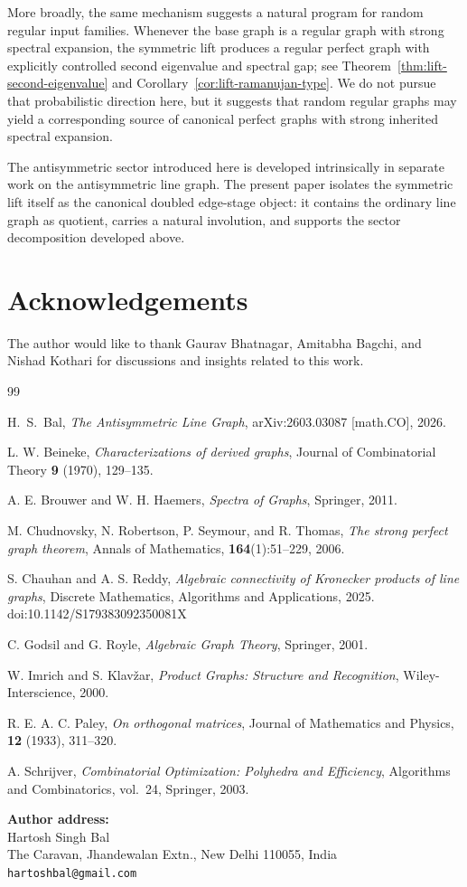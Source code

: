 \documentclass[11pt]{article}
\theoremstyle{plain}
\begin{document}
More broadly, the same mechanism suggests a natural program for random regular input families. Whenever the
base graph is a regular graph with strong spectral expansion, the symmetric lift produces a regular perfect
graph with explicitly controlled second eigenvalue and spectral gap; see
Theorem~\ref{thm:lift-second-eigenvalue} and Corollary~\ref{cor:lift-ramanujan-type}. We do not pursue that
probabilistic direction here, but it suggests that random regular graphs may yield a corresponding source of
canonical perfect graphs with strong inherited spectral expansion.

The antisymmetric sector introduced here is developed intrinsically in separate work on the antisymmetric
line graph. The present paper isolates the symmetric lift itself as the canonical doubled edge-stage object:
it contains the ordinary line graph as quotient, carries a natural involution, and supports the sector
decomposition developed above.

\section*{Acknowledgements}

The author would like to thank Gaurav Bhatnagar, Amitabha Bagchi, and Nishad Kothari for discussions and insights related to this work.


\begin{thebibliography}{99}

H.~S.~Bal,
\newblock \emph{The Antisymmetric Line Graph},
\newblock arXiv:2603.03087 [math.CO], 2026.


L. W. Beineke,
\emph{Characterizations of derived graphs},
Journal of Combinatorial Theory \textbf{9} (1970), 129--135.

A. E. Brouwer and W. H. Haemers,
\emph{Spectra of Graphs},
Springer, 2011.

M. Chudnovsky, N. Robertson, P. Seymour, and R. Thomas,
\emph{The strong perfect graph theorem},
Annals of Mathematics, \textbf{164}(1):51--229, 2006.

S. Chauhan and A. S. Reddy,
\emph{Algebraic connectivity of Kronecker products of line graphs},
Discrete Mathematics, Algorithms and Applications, 2025.
doi:10.1142/S179383092350081X


C. Godsil and G. Royle,
\emph{Algebraic Graph Theory},
Springer, 2001.

W. Imrich and S. Klav\v{z}ar,
\emph{Product Graphs: Structure and Recognition},
Wiley-Interscience, 2000.

R. E. A. C. Paley,
\emph{On orthogonal matrices},
Journal of Mathematics and Physics, \textbf{12} (1933), 311--320.

A. Schrijver,
\emph{Combinatorial Optimization: Polyhedra and Efficiency},
Algorithms and Combinatorics, vol.\ 24, Springer, 2003.


\end{thebibliography}

\vspace{2em}
\noindent\textbf{Author address:} \\
Hartosh Singh Bal \\
The Caravan, Jhandewalan Extn., New Delhi 110055, India \\
\texttt{hartoshbal@gmail.com}
\end{document}
